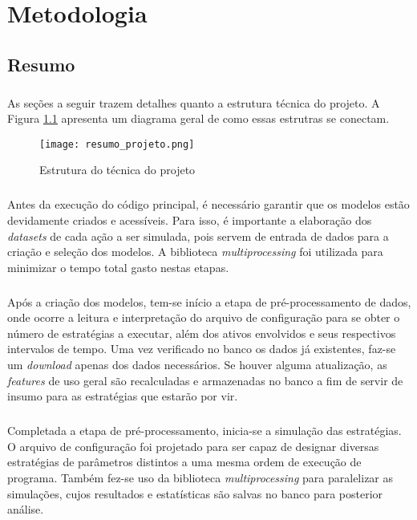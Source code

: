 \chapter{Metodologia}
\label{cap3}



\FloatBarrier
\section{Resumo}

\paragraph{} As seções a seguir trazem detalhes quanto a estrutura técnica do projeto. A Figura \ref{fig:100} apresenta um diagrama geral de como essas estrutras se conectam.

\begin{figure}[!htb]
    \texttt{[image: resumo\_projeto.png]}
    \centering
    \caption{Estrutura do técnica do projeto}
    \label{fig:100}
\end{figure}

\paragraph{} Antes da execução do código principal, é necessário garantir que os modelos estão devidamente criados e acessíveis. Para isso, é importante a elaboração dos \textit{datasets} de cada ação a ser simulada, pois servem de entrada de dados para a criação e seleção dos modelos. A biblioteca \textit{multiprocessing} foi utilizada para minimizar o tempo total gasto nestas etapas.

\paragraph{} Após a criação dos modelos, tem-se início a etapa de pré-processamento de dados, onde ocorre a leitura e interpretação do arquivo de configuração para se obter o número de estratégias a executar, além dos ativos envolvidos e seus respectivos intervalos de tempo. Uma vez verificado no banco os dados já existentes, faz-se um \textit{download} apenas dos dados necessários. Se houver alguma atualização, as \textit{features} de uso geral são recalculadas e armazenadas no banco a fim de servir de insumo para as estratégias que estarão por vir.

\paragraph{} Completada a etapa de pré-processamento, inicia-se a simulação das estratégias. O arquivo de configuração foi projetado para ser capaz de designar diversas estratégias de parâmetros distintos a uma mesma ordem de execução de programa. Também fez-se uso da biblioteca \textit{multiprocessing} para paralelizar as simulações, cujos resultados e estatísticas são salvas no banco para posterior análise.

